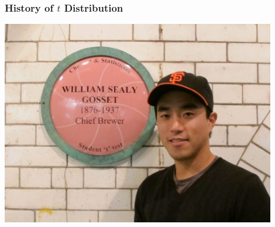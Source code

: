 \documentclass[handout]{beamer}
\begin{document}
\begin{frame}
\frametitle{History of $t$ Distribution}
\begin{center}
\includegraphics[width=0.9\textwidth]{figure/guinness.jpg}
\end{center}
\end{frame}
\end{document}
